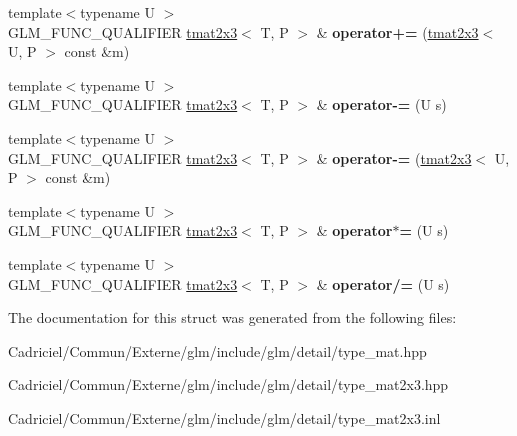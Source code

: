 \begin{DoxyCompactItemize}
\item 
{\footnotesize template$<$typename U $>$ }\\G\+L\+M\+\_\+\+F\+U\+N\+C\+\_\+\+Q\+U\+A\+L\+I\+F\+I\+ER \hyperlink{structglm_1_1detail_1_1tmat2x3}{tmat2x3}$<$ T, P $>$ \& {\bfseries operator+=} (\hyperlink{structglm_1_1detail_1_1tmat2x3}{tmat2x3}$<$ U, P $>$ const \&m)\hypertarget{structglm_1_1detail_1_1tmat2x3_a5e17d74534e51b89fc4ef088fa42c867}{}\label{structglm_1_1detail_1_1tmat2x3_a5e17d74534e51b89fc4ef088fa42c867}

\item 
{\footnotesize template$<$typename U $>$ }\\G\+L\+M\+\_\+\+F\+U\+N\+C\+\_\+\+Q\+U\+A\+L\+I\+F\+I\+ER \hyperlink{structglm_1_1detail_1_1tmat2x3}{tmat2x3}$<$ T, P $>$ \& {\bfseries operator-\/=} (U s)\hypertarget{structglm_1_1detail_1_1tmat2x3_a9390f2064f9bdea63dc4e796822a42d4}{}\label{structglm_1_1detail_1_1tmat2x3_a9390f2064f9bdea63dc4e796822a42d4}

\item 
{\footnotesize template$<$typename U $>$ }\\G\+L\+M\+\_\+\+F\+U\+N\+C\+\_\+\+Q\+U\+A\+L\+I\+F\+I\+ER \hyperlink{structglm_1_1detail_1_1tmat2x3}{tmat2x3}$<$ T, P $>$ \& {\bfseries operator-\/=} (\hyperlink{structglm_1_1detail_1_1tmat2x3}{tmat2x3}$<$ U, P $>$ const \&m)\hypertarget{structglm_1_1detail_1_1tmat2x3_af1abd73945e5346e7ae1e5a953979aff}{}\label{structglm_1_1detail_1_1tmat2x3_af1abd73945e5346e7ae1e5a953979aff}

\item 
{\footnotesize template$<$typename U $>$ }\\G\+L\+M\+\_\+\+F\+U\+N\+C\+\_\+\+Q\+U\+A\+L\+I\+F\+I\+ER \hyperlink{structglm_1_1detail_1_1tmat2x3}{tmat2x3}$<$ T, P $>$ \& {\bfseries operator$\ast$=} (U s)\hypertarget{structglm_1_1detail_1_1tmat2x3_acb4473b53bf98d8330710d21fcfd9413}{}\label{structglm_1_1detail_1_1tmat2x3_acb4473b53bf98d8330710d21fcfd9413}

\item 
{\footnotesize template$<$typename U $>$ }\\G\+L\+M\+\_\+\+F\+U\+N\+C\+\_\+\+Q\+U\+A\+L\+I\+F\+I\+ER \hyperlink{structglm_1_1detail_1_1tmat2x3}{tmat2x3}$<$ T, P $>$ \& {\bfseries operator/=} (U s)\hypertarget{structglm_1_1detail_1_1tmat2x3_a98a33b4a96b4e55c24aee023e382eedd}{}\label{structglm_1_1detail_1_1tmat2x3_a98a33b4a96b4e55c24aee023e382eedd}

\end{DoxyCompactItemize}


The documentation for this struct was generated from the following files\+:\begin{DoxyCompactItemize}
\item 
Cadriciel/\+Commun/\+Externe/glm/include/glm/detail/type\+\_\+mat.\+hpp\item 
Cadriciel/\+Commun/\+Externe/glm/include/glm/detail/type\+\_\+mat2x3.\+hpp\item 
Cadriciel/\+Commun/\+Externe/glm/include/glm/detail/type\+\_\+mat2x3.\+inl\end{DoxyCompactItemize}
